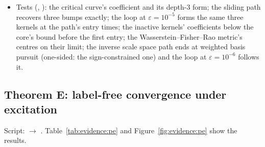 \begin{itemize}
    $10^{-6}$, $10^{-8}$ (Wasserstein--Fisher--Rao: none at $10^{-6}$, all at $10^{-10}$); a tie is shared (0.4, 0.4), a
    near tie takes two kernels at $\varepsilon = 10^{-6}$; the creep's speed is the profile's to 0.990--0.996
    ($\varepsilon = 10^{-8}$) and 0.9999--1.0000 ($10^{-10}$); wider bumps are fitted along a staircase. (D) Moving
    widths fit bumps of widths 0.2 and 0.08 with exactly three kernels at $\varepsilon = 10^{-6}$, where fixed widths need
    six kernels or miss the amplitudes (0.71, $-0.48$, 0.59).
  \item Tests (, ): the critical curve's coefficient and
    its depth-3 form; the sliding path recovers three bumps exactly; the loop at $\varepsilon = 10^{-5}$ forms the same
    three kernels at the path's entry times; the inactive kernels' coefficients below the core's bound before the first
    entry; the Wasserstein--Fisher--Rao metric's centres on their limit; the inverse scale space path ends at weighted
    basis pursuit (one-sided: the sign-constrained one) and the loop at $\varepsilon = 10^{-6}$ follows it.
\end{itemize}

\subsection{Theorem E: label-free convergence under excitation}

Script:  $\to$ . Table~\ref{tab:evidence:pe} and
Figure~\ref{fig:evidence:pe} show the results.

